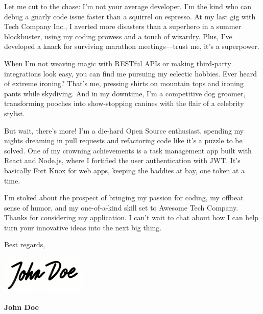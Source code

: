 \begin{minipage}[t][\textheight-1em]{\textwidth}
	Let me cut to the chase: I’m not your average developer. I’m the kind who can debug a gnarly code issue faster than a squirrel on espresso. At my last gig with Tech Company Inc., I averted more disasters than a superhero in a summer blockbuster, using my coding prowess and a touch of wizardry. Plus, I’ve developed a knack for surviving marathon meetings—trust me, it’s a superpower.

    \vspace{1em}

	When I'm not weaving magic with RESTful APIs or making third-party integrations look easy, you can find me pursuing my eclectic hobbies. Ever heard of extreme ironing? That's me, pressing shirts on mountain tops and ironing pants while skydiving. And in my downtime, I’m a competitive dog groomer, transforming pooches into show-stopping canines with the flair of a celebrity stylist.

    \vspace{1em}

	But wait, there’s more! I’m a die-hard Open Source enthusiast, spending my nights dreaming in pull requests and refactoring code like it’s a puzzle to be solved. One of my crowning achievements is a task management app built with React and Node.js, where I fortified the user authentication with JWT. It's basically Fort Knox for web apps, keeping the baddies at bay, one token at a time.

    \vspace{1em}

	I’m stoked about the prospect of bringing my passion for coding, my offbeat sense of humor, and my one-of-a-kind skill set to Awesome Tech Company. Thanks for considering my application. I can’t wait to chat about how I can help turn your innovative ideas into the next big thing.

	\vspace{1em}

	\begin{flushright}
		Best regards,

		\vspace{2em}

		\includegraphics[height=5em]{media/signature.png}

		\textbf{John Doe}
	\end{flushright}

\end{minipage}
